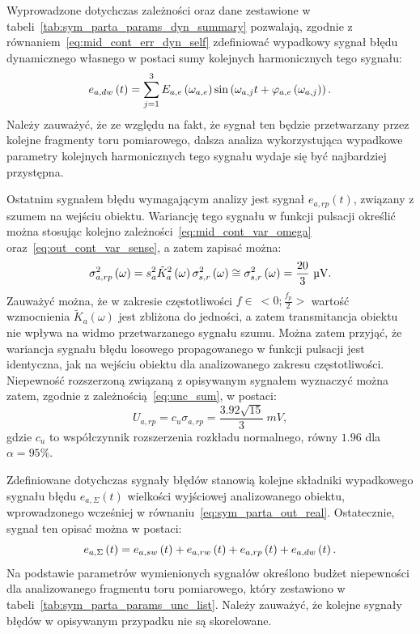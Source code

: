Wyprowadzone dotychczas zależności oraz dane zestawione w tabeli~\ref{tab:sym_parta_params_dyn_summary} pozwalają, zgodnie z równaniem~\eqref{eq:mid_cont_err_dyn_self} zdefiniować wypadkowy sygnał błędu dynamicznego własnego w postaci sumy kolejnych harmonicznych tego sygnału:
\begin{equation}
e_{a,dw} \left(t\right) = \sum _{j=1} ^{3} E_{a,e} \left(\omega_{a,e}\right) \sin \left(\omega_{a,j} t + \varphi_{a,e} \left(\omega_{a,j}\right)\right) \label{eq:sym_parta_dyn_self_sum}.
\end{equation}
Należy zauważyć, że ze względu na fakt, że sygnał ten będzie przetwarzany przez kolejne fragmenty toru pomiarowego, dalsza analiza wykorzystująca wypadkowe parametry kolejnych harmonicznych tego sygnału wydaje się być najbardziej przystępna.

Ostatnim sygnałem błędu wymagającym analizy jest sygnał $e_{a,rp}(t)$, związany z szumem na wejściu obiektu. Wariancję tego sygnału w funkcji pulsacji określić można stosując kolejno zależności~\eqref{eq:mid_cont_var_omega} oraz~\eqref{eq:out_cont_var_sense}, a zatem zapisać można:
\begin{equation}
\sigma_{a,rp}^{2} \emb{\omega} = s_{a}^{2} \tilde{K}_{a}^{2} \emb{\omega} \sigma_{s,r}^{2} \emb{\omega} \cong \sigma_{s,r}^{2} \emb{\omega} = \frac{20}{3}~\unit{\micro V} \label{eq:sym_parta_rand_prop_var_omega}.
\end{equation}
Zauważyć można, że w zakresie częstotliwości $f \in~<0;\frac{f_{p}}{2}>$ wartość wzmocnienia $\tilde{K}_{a}(\omega)$ jest zbliżona do jedności, a zatem transmitancja obiektu nie wpływa na widmo przetwarzanego sygnału szumu. Można zatem przyjąć, że wariancja sygnału błędu losowego propagowanego w funkcji pulsacji jest identyczna, jak na wejściu obiektu dla analizowanego zakresu częstotliwości. Niepewność rozszerzoną związaną z opisywanym sygnałem wyznaczyć można zatem, zgodnie z zależnością~\eqref{eq:unc_sum}, w postaci:
\begin{equation}
U_{a,rp} = c_{u} \sigma_{a,rp} = \frac{3.92 \sqrt{15}}{3}~\unit{mV} \label{eq:sym_parta_rand_prop_unc},
\end{equation}
gdzie $c_{u}$ to współczynnik rozszerzenia rozkładu normalnego, równy $1.96$ dla $\alpha = 95\%$.

Zdefiniowane dotychczas sygnały błędów stanowią kolejne składniki wypadkowego sygnału błędu $e_{a,\Sigma}(t)$ wielkości wyjściowej analizowanego obiektu, wprowadzonego wcześniej w równaniu~\eqref{eq:sym_parta_out_real}. Ostatecznie, sygnał ten opisać można w postaci:
\begin{equation}
e_{a,\Sigma} \left(t\right) = e_{a,sw} \left(t\right) + e_{a,rw} \left(t\right) + e_{a,rp} \left(t\right) + e_{a,dw} \left(t\right) \label{eq:sym_parta_error_sum}.
\end{equation}
Na podstawie parametrów wymienionych sygnałów określono budżet niepewności dla analizowanego fragmentu toru pomiarowego, który zestawiono w tabeli~\ref{tab:sym_parta_params_unc_list}. Należy zauważyć, że kolejne sygnały błędów w opisywanym przypadku nie są skorelowane.

